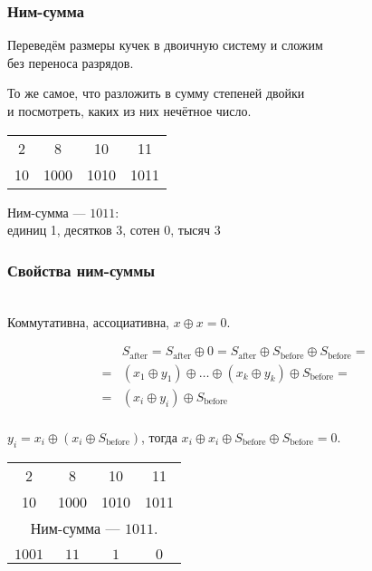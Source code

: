\begin{frame} \frametitle{Ним-сумма}
	Переведём размеры кучек в двоичную систему и сложим \\
	без переноса разрядов.

	То же самое, что разложить в сумму степеней двойки \\
	и посмотреть, каких из них нечётное число. \medskip

\begin{center}\begin{tabular}{cccc}
2 & 8 & 10 & 11 \\
{\small 10} & {\small 1000} & {\small 1010} & {\small 1011}
\end{tabular}

Ним-сумма — $1011$:\\
единиц 1, десятков 3, сотен 0, тысяч 3 \end{center}
\end{frame}

\begin{frame} \frametitle{Свойства ним-суммы} \ \\ [-0.4cm]
	Коммутативна, ассоциативна, $x \oplus x = 0$. \vspace{-0.8cm}
\renewcommand{\sb}{S_{\text{before}}}
\newcommand{\sa}{S_{\text{after}}}

\begin{align*}
&	\sa = \sa \oplus 0 = \sa \oplus \sb \oplus \sb = \\
= &	(x_1 \oplus y_1) \oplus \ldots \oplus (x_k \oplus y_k) \oplus \sb = \\
= & (x_i \oplus y_i) \oplus \sb \\
\end{align*} \vspace{-1.3cm} \pause

$y_i = x_i \oplus (x_i \oplus \sb)$, тогда $x_i \oplus x_i \oplus \sb \oplus \sb = 0$. \pause

\begin{center}\begin{tabular}{cccc}
2 & 8 & 10 & 11 \\
{\small 10} & {\small 1000} & {\small 1010} & {\small 1011} \\
\multicolumn{4}{c}{Ним-сумма — $1011$.} \\ \pause
\phantom{ававав} & \phantom{ававав} & \phantom{ававав} & \phantom{ававав} \\
{\small $1001$} & {\small $11$} & {\small $1$} & {\small $0$} \\
\end{tabular} \end{center}
\end{frame}

